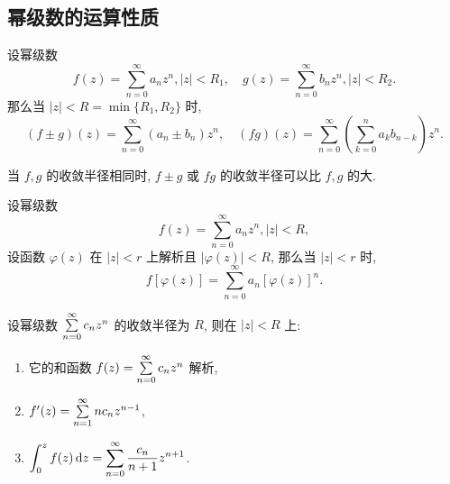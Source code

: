 \documentclass[nocolor,theme=doremi,lang=cn,11pt,chinese,twoside,openright,usesamecnt]{elegantbook}
\begin{document}
% 
% 

% 

\subsection{幂级数的运算性质}

\begin{theorem}
	设幂级数
	\[f(z)=\sum_{n=0}^\infty a_nz^n,|z|<R_1,\quad
	g(z)=\sum_{n=0}^\infty b_nz^n,|z|<R_2.\]
	{那么当 $|z|<R=\min\{R_1,R_2\}$ 时,
	\[(f\pm g)(z)=\sum_{n=0}^\infty (a_n\pm b_n)z^n,\quad
	(fg)(z)=\sum_{n=0}^\infty\left(\sum_{k=0}^na_kb_{n-k}\right)z^n.\]}
\end{theorem}

当 $f,g$ 的收敛半径相同时, $f\pm g$ 或 $fg$ 的收敛半径可以比 $f,g$ 的大.

\begin{theorem}
	设幂级数
	\[f(z)=\sum_{n=0}^\infty a_nz^n,|z|<R,\]
	设函数 $\varphi(z)$ 在 $|z|<r$ 上解析且 $|\varphi(z)|<R$, 
	{那么当 $|z|<r$ 时,
	\[f[\varphi(z)]=\sum_{n=0}^\infty a_n[\varphi(z)]^n.\]}
\end{theorem}

\begin{theorem}
	设幂级数 $\sum\limits_{n=0}^\infty c_nz^n$ 的收敛半径为 $R$, 则在 $|z|<R$ 上:
	\begin{enumerate}
		\item 它的和函数 $f(z)=\sum\limits_{n=0}^\infty c_nz^n$ 解析,
		\item $f'(z)=\sum\limits_{n=1}^\infty nc_nz^{n-1}$,
		\item $\displaystyle\int_0^zf(z)\,\mathrm{d} z=\sum_{n=0}^\infty \frac{c_n}{n+1}z^{n+1}$.
	\end{enumerate}
\end{theorem}
\end{document}
